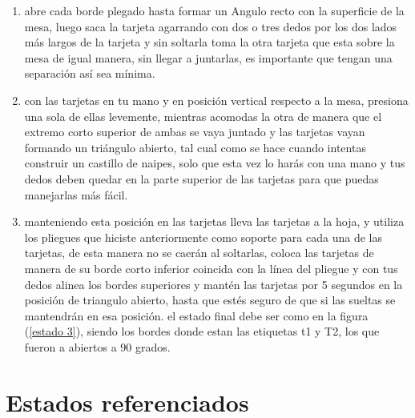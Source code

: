 \documentclass{article}
\begin{document}
\begin{enumerate}
\begin{enumerate}
  \item abre cada borde plegado hasta formar un Angulo recto con la superficie de la mesa, luego saca la tarjeta agarrando con dos o tres dedos por los dos lados más largos de la tarjeta y sin soltarla toma la otra tarjeta que esta sobre la mesa de igual manera, sin llegar a juntarlas, es importante que tengan una separación así sea mínima.
  
  \item con las tarjetas en tu mano y en posición vertical respecto a la mesa, presiona una sola de ellas levemente, mientras acomodas la otra de manera que el extremo corto superior de ambas se vaya juntado y las tarjetas vayan formando un triángulo abierto, tal cual como se hace cuando intentas construir un castillo de naipes, solo que esta vez lo harás con una mano y tus dedos deben quedar en la parte superior de las tarjetas para que puedas manejarlas más fácil.
  
  \item manteniendo esta posición en las tarjetas lleva las tarjetas a la hoja, y utiliza los pliegues que hiciste anteriormente como soporte para cada una de las tarjetas, de esta manera no se caerán al soltarlas, coloca las tarjetas de manera de su borde corto inferior coincida con la línea del pliegue y con tus dedos alinea los bordes superiores y mantén las tarjetas por 5 segundos en la posición de triangulo abierto, hasta que estés seguro de que si las sueltas se mantendrán en esa posición. el estado final debe ser como en la figura (\ref{estado 3}), siendo los bordes donde estan las etiquetas t1 y T2, los que fueron a abiertos a 90 grados.
  

  
\end{enumerate}
\end{enumerate}

\section{Estados referenciados} \label{imagenes}
\end{document}
